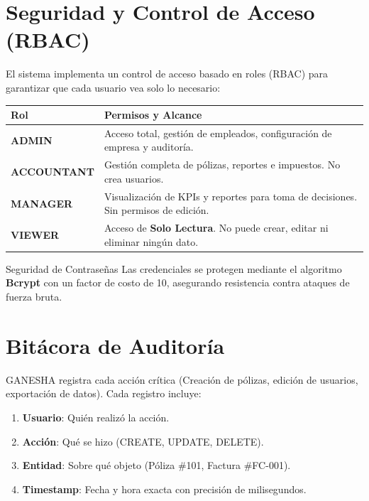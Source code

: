 \documentclass[11pt,a4paper]{article}
\begin{document}
\section{Seguridad y Control de Acceso (RBAC)}
El sistema implementa un control de acceso basado en roles (RBAC) para garantizar que cada usuario vea solo lo necesario:

\begin{table}[h]
\centering
\begin{tabular}{|l|p{10cm}|}
\hline
\rowcolor{gold!20} \textbf{Rol} & \textbf{Permisos y Alcance} \\ \hline
\textbf{ADMIN} & Acceso total, gestión de empleados, configuración de empresa y auditoría. \\ \hline
\textbf{ACCOUNTANT} & Gestión completa de pólizas, reportes e impuestos. No crea usuarios. \\ \hline
\textbf{MANAGER} & Visualización de KPIs y reportes para toma de decisiones. Sin permisos de edición. \\ \hline
\textbf{VIEWER} & Acceso de \textbf{Solo Lectura}. No puede crear, editar ni eliminar ningún dato. \\ \hline
\end{tabular}
\end{table}

\begin{infobox}{Seguridad de Contraseñas}
Las credenciales se protegen mediante el algoritmo \textbf{Bcrypt} con un factor de costo de 10, asegurando resistencia contra ataques de fuerza bruta.
\end{infobox}

\section{Bitácora de Auditoría}
GANESHA registra cada acción crítica (Creación de pólizas, edición de usuarios, exportación de datos). Cada registro incluye:
\begin{enumerate}
    \item \textbf{Usuario}: Quién realizó la acción.
    \item \textbf{Acción}: Qué se hizo (CREATE, UPDATE, DELETE).
    \item \textbf{Entidad}: Sobre qué objeto (Póliza \#101, Factura \#FC-001).
    \item \textbf{Timestamp}: Fecha y hora exacta con precisión de milisegundos.
\end{enumerate}
\end{document}
